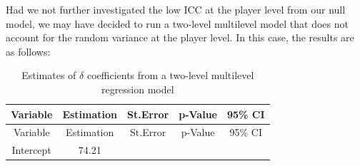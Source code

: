 \documentclass[12pt,twoside]{reedthesis}
\begin{document}
Had we not further investigated the low ICC at the player level from our
null model, we may have decided to run a two-level multilevel model that
does not account for the random variance at the player level. In this
case, the results are as follows:
\begin{longtable}[]{@{}ccccc@{}}
\caption{\label{tab:tab2} Estimates of \(\delta\) coefficients from a
two-level multilevel regression model}\tabularnewline
\toprule
\begin{minipage}[b]{0.25\columnwidth}\centering\strut
Variable\strut
\end{minipage} & \begin{minipage}[b]{0.15\columnwidth}\centering\strut
Estimation\strut
\end{minipage} & \begin{minipage}[b]{0.15\columnwidth}\centering\strut
St.Error\strut
\end{minipage} & \begin{minipage}[b]{0.15\columnwidth}\centering\strut
p-Value\strut
\end{minipage} & \begin{minipage}[b]{0.17\columnwidth}\centering\strut
95\% CI\strut
\end{minipage}\tabularnewline
\midrule
\endfirsthead
\toprule
\begin{minipage}[b]{0.25\columnwidth}\centering\strut
Variable\strut
\end{minipage} & \begin{minipage}[b]{0.15\columnwidth}\centering\strut
Estimation\strut
\end{minipage} & \begin{minipage}[b]{0.15\columnwidth}\centering\strut
St.Error\strut
\end{minipage} & \begin{minipage}[b]{0.15\columnwidth}\centering\strut
p-Value\strut
\end{minipage} & \begin{minipage}[b]{0.17\columnwidth}\centering\strut
95\% CI\strut
\end{minipage}\tabularnewline
\midrule
\endhead
\begin{minipage}[t]{0.25\columnwidth}\centering\strut
Intercept\strut
\end{minipage} & \begin{minipage}[t]{0.15\columnwidth}\centering\strut
74.21\strut
\end{minipage} & \begin{minipage}[t]{0.15\columnwidth}\centering\strut

\end{minipage}
\end{longtable}
\end{document}
